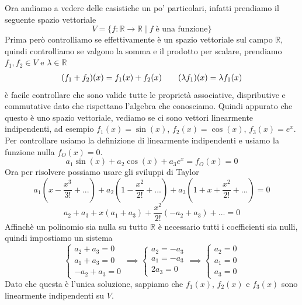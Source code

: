 \documentclass{rapport}
\begin{document}
Ora andiamo a vedere delle casistiche un po' particolari, infatti prendiamo il seguente spazio vettoriale
\[
V = \{ f:\mathbb{R}\to \mathbb{R} \;|\; f\; \text{è una funzione}\}
\]
Prima però controlliamo se effettivamente è un spazio vettoriale sul campo $\mathbb{R}$, quindi controlliamo se valgono la somma e il prodotto per scalare, prendiamo $f_1, f_2 \in V$ e $\lambda \in \mathbb{R}$
\[\begin{array}{c@{\qquad}c}
  (f_1+f_2)(x) = f_1(x) + f_2(x) & (\lambda f_1)(x) = \lambda f_1(x)
\end{array}\]
è facile controllare che sono valide tutte le proprietà associative, dispributive e commutative dato che rispettano l'algebra che conosciamo. Quindi appurato che questo è uno spazio vettoriale, vediamo se ci sono vettori linearmente indipendenti, ad esempio $f_1(x)=\sin(x)$, $f_2(x)=\cos(x)$, $f_3(x)=e^x$. Per controllare usiamo la definizione di linearmente indipendenti e usiamo la funzione nulla $f_O(x)=0$.
\[
a_1 \sin(x) + a_2\cos(x) + a_3e^x = f_O(x) = 0
\]
Ora per risolvere possiamo usare gli sviluppi di Taylor
\[
a_1\left(x-\dfrac{x^3}{3!}+...\right) + a_2 \left(1-\dfrac{x^2}{2!}+...\right) + a_3\left(1+x+\dfrac{x^2}{2!}+...\right) =0
\]
\[
a_2+a_3 + x\left(a_1+a_3\right) + \dfrac{x^2}{2!}\left(-a_2+a_3\right) + ... = 0 
\]
Affinchè un polinomio sia nulla su tutto $\mathbb{R}$ è necessario tutti i coefficienti sia nulli, quindi impostiamo un sistema
\[
\begin{cases}
  a_2+a_3 = 0\\
  a_1+a_3 = 0 \\
  -a_2+a_3 = 0
\end{cases} \implies
\begin{cases}
a_2 = -a_3 \\
a_1 = -a_3 \\
2a_3 = 0
\end{cases}\implies
\begin{cases}
a_2 = 0 \\
a_1 = 0\\
a_3 = 0
\end{cases}
\]  
Dato che questa è l'unica soluzione, sappiamo che $f_1(x)$, $f_2(x)$ e $f_3(x)$ sono linearmente indipendenti su $V$.
\end{document}
